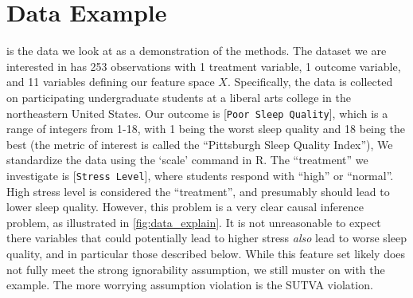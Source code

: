 \documentclass[11pt,  dvipsnames, table, x11name]{article}
\begin{document}
\section{Data Example}

\cite{onyper2012class} is the data we look at as a demonstration of the methods.  The dataset we are interested in has 253 observations with 1 treatment variable, 1 outcome variable, and 11 variables defining our feature space $X$.  Specifically, the data is collected on participating undergraduate students at a liberal arts college in the northeastern United States. Our outcome is [{\tt Poor Sleep Quality}], which is a range of integers from 1-18, with 1 being the worst sleep quality and 18 being the best (the metric of interest is called the ``Pittsburgh Sleep Quality Index''),  We standardize the data using the  `scale' command in R.  The ``treatment'' we investigate is [{\tt Stress Level}], where students respond with ``high'' or ``normal''.  High stress level is considered the ``treatment'', and presumably should lead to lower sleep quality.  However, this problem is a very clear causal inference problem, as illustrated in \autoref{fig:data_explain}.  It is not unreasonable to expect there variables that could potentially lead to higher stress \emph{also} lead to worse sleep quality, and in particular those described below.  While this feature set likely does not fully meet the strong ignorability assumption, we  still muster on with the example. The more worrying assumption violation is the SUTVA violation.  
\end{document}
